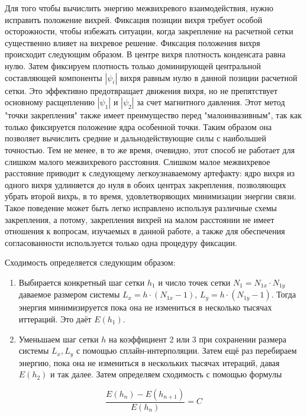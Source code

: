 Для того чтобы вычислить энергию межвихревого взаимодействия, нужно исправить 
положение вихрей. Фиксация позиции вихря требует особой осторожности, 
чтобы избежать ситуации, когда закрепление на расчетной сетки существенно 
влияет на вихревое решение. Фиксация положения вихря происходит следующим 
образом. В центре вихря плотность конденсата равна нулю. Затем фиксируем 
плотность только доминирующей центральной составляющей компоненты 
\( |\psi_i| \) вихря равным нулю в данной позиции расчетной сетки. Это 
эффективно предотвращает движения вихря, но не препятствует основному 
расщеплению \( |\psi_1| \) и \( |\psi_2| \) за счет магнитного давления. Этот 
метод "точки закрепления" также имеет преимущество перед "малоинвазивным", так 
как только фиксируется положение ядра особенной точки. Таким образом она 
позволяет вычислить средние и дальнодействующие силы с наибольшей точностью. 
Тем не менее, в то же время, очевидно, этот способ не работает для слишком 
малого межвихревого расстояния. Слишком малое межвихревое расстояние приводит 
к следующему легкоузнаваемому артефакту: ядро вихря из одного вихря удлиняется 
до нуля в обоих центрах закрепления, позволяющих убрать второй вихрь, в то 
время, удовлетворяющих минимизации энергии связи. Такое поведение может быть 
легко исправлено используя различные схемы закрепления, а потому, закрепления 
вихрей на малом расстоянии не имеет отношения к вопросам, изучаемых в данной 
работе, а также для обеспечения согласованности используется только одна 
процедуру фиксации.

Сходимость определяется следующим образом:
\begin{enumerate}
    \item Выбирается конкретный шаг сетки \( h_1 \) и число точек сетки 
        \( N_1 = N_{1x} \cdot N_{1y} \) даваемое размером системы
        \( L_x = h \cdot (N_{1x}-1) \), \( L_y = h \cdot (N_{1y}-1) \). 
        Тогда энергия минимизируется пока она не измениться в несколько
        тысячах иттераций. Это даёт \( E(h_1) \).
    \item Уменьшаем шаг сетки \( h \) на коэффициент 2 или 3 при сохранении 
        размера системы \( L_x, L_y \) с помощью сплайн-интерполяции. 
        Затем ещё раз перебираем энергию, пока она не измениться в 
        нескольких тысячах итераций, давая \( E(h_2) \) и так далее. 
        Затем определяем сходимость с помощью формулы
\end{enumerate}
\begin{equation}
    \frac{E(h_n) - E(h_{n+1})}{E(h_n)} = C
\end{equation}

